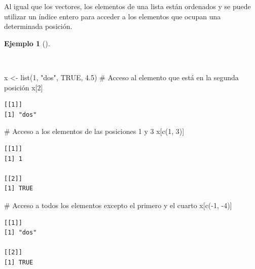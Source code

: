 \documentclass[
  a4paper,
]{scrreport}
\newenvironment{Shaded}{\begin{snugshade}}{\end{snugshade}}
\newcommand{\CommentTok}[1]{\textcolor[rgb]{0.37,0.37,0.37}{#1}}
\newcommand{\ConstantTok}[1]{\textcolor[rgb]{0.56,0.35,0.01}{#1}}
\newcommand{\DecValTok}[1]{\textcolor[rgb]{0.68,0.00,0.00}{#1}}
\newcommand{\FloatTok}[1]{\textcolor[rgb]{0.68,0.00,0.00}{#1}}
\newcommand{\FunctionTok}[1]{\textcolor[rgb]{0.28,0.35,0.67}{#1}}
\newcommand{\NormalTok}[1]{\textcolor[rgb]{0.00,0.23,0.31}{#1}}
\newcommand{\OtherTok}[1]{\textcolor[rgb]{0.00,0.23,0.31}{#1}}
\newcommand{\SpecialCharTok}[1]{\textcolor[rgb]{0.37,0.37,0.37}{#1}}
\newcommand{\StringTok}[1]{\textcolor[rgb]{0.13,0.47,0.30}{#1}}
\theoremstyle{definition}
\theoremstyle{definition}
\newtheorem{example}{Ejemplo}[chapter]
\theoremstyle{remark}
\begin{document}
Al igual que los vectores, los elementos de una lista están ordenados y
se puede utilizar un índice entero para acceder a los elementos que
ocupan una determinada posición.

\begin{example}[]\protect\hypertarget{exm-acceso-lista-indice-entero}{}\label{exm-acceso-lista-indice-entero}

~

\begin{Shaded}
\begin{Highlighting}[]
\NormalTok{x }\OtherTok{\textless{}{-}} \FunctionTok{list}\NormalTok{(}\DecValTok{1}\NormalTok{, }\StringTok{"dos"}\NormalTok{, }\ConstantTok{TRUE}\NormalTok{, }\FloatTok{4.5}\NormalTok{)}
\CommentTok{\# Acceso al elemento que está en la segunda posición}
\NormalTok{x[}\DecValTok{2}\NormalTok{]}
\end{Highlighting}
\end{Shaded}

\begin{verbatim}
[[1]]
[1] "dos"
\end{verbatim}

\begin{Shaded}
\begin{Highlighting}[]
\CommentTok{\# Acceso a los elementos de las posiciones 1 y 3}
\NormalTok{x[}\FunctionTok{c}\NormalTok{(}\DecValTok{1}\NormalTok{, }\DecValTok{3}\NormalTok{)]}
\end{Highlighting}
\end{Shaded}

\begin{verbatim}
[[1]]
[1] 1

[[2]]
[1] TRUE
\end{verbatim}

\begin{Shaded}
\begin{Highlighting}[]
\CommentTok{\# Acceso a todos los elementos excepto el primero y el cuarto}
\NormalTok{x[}\FunctionTok{c}\NormalTok{(}\SpecialCharTok{{-}}\DecValTok{1}\NormalTok{, }\SpecialCharTok{{-}}\DecValTok{4}\NormalTok{)]}
\end{Highlighting}
\end{Shaded}

\begin{verbatim}
[[1]]
[1] "dos"

[[2]]
[1] TRUE
\end{verbatim}

\end{example}
\end{document}
